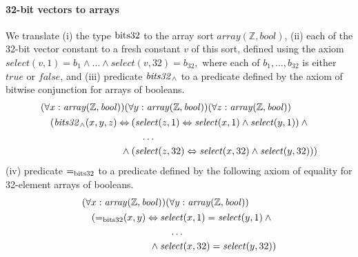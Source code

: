 \paragraph{32-bit vectors to arrays}
We translate
(i) the type $\mathrm{bits32}$ to the array sort $\mathit{array}(\mathbb{Z},\mathit{bool})$,
(ii) each of the 32-bit vector constant to a fresh constant $v$ of this sort, defined using the axiom $\mathit{select}(v,1)=b_1\wedge\ldots\wedge\allowbreak\mathit{select}(v, 32)=b_{32},$ where each of $b_1,\ldots,b_{32}$ is either $\mathit{true}$ or $\mathit{false}$, and
(iii) predicate $\mathit{bits32}_\wedge$ to a predicate defined by the axiom of bitwise conjunction for arrays of booleans.
\begin{equation*}
\begin{aligned}
&(\forall x:\mathit{array}(\mathbb{Z},\mathit{bool}))(\forall y:\mathit{array}(\mathbb{Z},\mathit{bool}))(\forall z:\mathit{array}(\mathbb{Z},\mathit{bool}))\\
&\quad\begin{aligned}
      (\mathit{bits32}_\wedge(x,y,z)\Leftrightarrow\:&(\mathit{select}(z,1)\Leftrightarrow\mathit{select}(x,1)\wedge\mathit{select}(y,1))\:\wedge\\
      &\quad\ldots\\
      \wedge\:&(\mathit{select}(z,32)\Leftrightarrow\mathit{select}(x,32)\wedge\mathit{select}(y,32)))
      \end{aligned}
\end{aligned}
\end{equation*}
(iv) predicate $\mathit{=}_{\mathrm{bits32}}$ to a predicate defined by the following axiom of equality for 32-element arrays of booleans.
\begin{equation*}
\begin{aligned}
&(\forall x:\mathit{array}(\mathbb{Z},\mathit{bool}))(\forall y:\mathit{array}(\mathbb{Z},\mathit{bool}))\\
&\quad\begin{aligned}
      (\mathit{=}_{\mathrm{bits32}}(x, y)\Leftrightarrow\:&\mathit{select}(x,1)=\mathit{select}(y,1)\:\wedge\\
      &\quad\ldots\\
      \wedge\:&\mathit{select}(x, 32)=\mathit{select}(y,32))
      \end{aligned}
\end{aligned}
\end{equation*}


